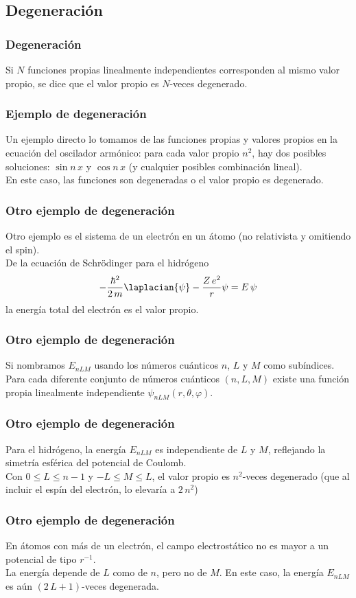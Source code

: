 \subsection{Degeneración}
\begin{frame}
\frametitle{Degeneración}
Si $N$ funciones propias linealmente independientes corresponden al mismo valor propio, se dice que el valor propio es $N$-veces degenerado.
\end{frame}
\begin{frame}
\frametitle{Ejemplo de degeneración}
Un ejemplo directo lo tomamos de las funciones propias y valores propios en la ecuación del oscilador armónico: para cada valor propio $n^{2}$, hay dos posibles soluciones: $\sin n \, x$ y $\cos n \, x$ (y cualquier posibles combinación lineal). 
\\
\bigskip
\pause
En este caso, las funciones son degeneradas o el valor propio es degenerado.
\end{frame}
\begin{frame}
\frametitle{Otro ejemplo de degeneración}
Otro ejemplo es el sistema de un electrón en un átomo (no relativista y omitiendo el spin).
\\
\bigskip
De la ecuación de Schrödinger para el hidrógeno
\begin{align*}
- \dfrac{\hbar^{2}}{2 \, m} \laplacian{\psi} - \dfrac{Z \, e^{2}}{r} \psi =  E \, \psi
\end{align*}
la energía total del electrón es el valor propio.
\end{frame}
\begin{frame}
\frametitle{Otro ejemplo de degeneración}
Si nombramos $E_{nLM}$ usando los números cuánticos $n$, $L$ y $M$ como subíndices.
\\
\bigskip
\pause
Para cada diferente conjunto de números cuánticos $(n, L, M)$ existe una función propia linealmente independiente $\psi_{nLM}(r,\theta, \varphi)$.
\end{frame}
\begin{frame}
\frametitle{Otro ejemplo de degeneración}
Para el hidrógeno, la energía $E_{nLM}$ es independiente de $L$ y $M$, reflejando la simetría esférica del potencial de Coulomb.
\\
\bigskip
\pause
Con $0 \leq L \leq n-1$ y $-L \leq M \leq L$, el valor propio es $n^{2}$-veces degenerado (que al incluir el espín del electrón, lo elevaría a $2 \, n^{2}$)
\end{frame}
\begin{frame}
\frametitle{Otro ejemplo de degeneración}
En átomos con más de un electrón, el campo electrostático no es mayor a un potencial de tipo $r^{-1}$. 
\\
\bigskip
\pause
La energía depende de $L$ como de $n$, pero no de $M$. En este caso, la energía $E_{nLM}$ es aún $(2 \, L + 1)$-veces degenerada.
\end{frame}
